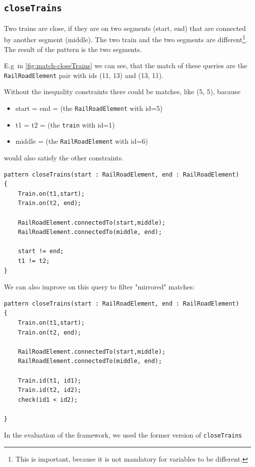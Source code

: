 \vspace{\belowdisplayskip}







\subsection{\texttt{closeTrains}}

Two trains are close, if they are on two segments (start, end) that are connected by another segment (middle). The two train and the two segments are different\footnote{This is important, because it is not mandatory for variables to be different.}.
The result of the pattern is the two segments.

E.g\ in \autoref{fig:match-closeTrains} we can see, that the match of these queries are the \texttt{RailRoadElement} pair with ids (11, 13) and (13, 11). 

Without the inequality constraints there could be matches, like (5, 5), bacause
\begin{itemize}
	\item start = end = (the \texttt{RailRoadElement} with id=5)
	\item t1 = t2 = (the \texttt{train} with id=1)
	\item middle = (the \texttt{RailRoadElement} with id=6)

\end{itemize}
would also satisfy the other constraints.

\begin{minipage}{\textwidth}
\begin{lstlisting}[language = vql]
pattern closeTrains(start : RailRoadElement, end : RailRoadElement)
{
	Train.on(t1,start);
	Train.on(t2, end);
	
	RailRoadElement.connectedTo(start,middle); 
	RailRoadElement.connectedTo(middle, end);
		
	start != end; 
	t1 != t2;	
}
\end{lstlisting}
\end{minipage}

\begin{minipage}{\textwidth}
We can also improve on this query to filter "mirrored" matches:
\begin{lstlisting}[language = vql]
pattern closeTrains(start : RailRoadElement, end : RailRoadElement)
{
	Train.on(t1,start);
	Train.on(t2, end);
	
	RailRoadElement.connectedTo(start,middle); 
	RailRoadElement.connectedTo(middle, end);

	Train.id(t1, id1);
	Train.id(t2, id2);
	check(id1 < id2);
	
}
\end{lstlisting}
In the evaluation of the framework, we used the former version of \texttt{closeTrains}
\end{minipage}

